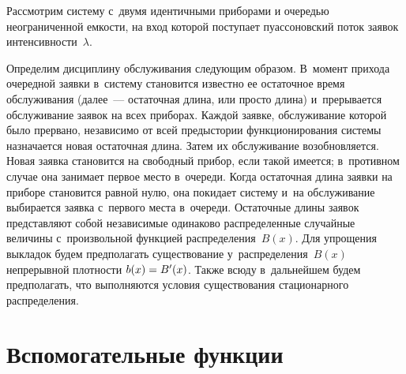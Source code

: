 \begin{multicols}{2}
Рассмотрим систему с~двумя идентичными приборами
и очередью неограниченной емкости, на вход которой поступает
пуассоновский поток заявок интенсивности~$\lambda$.


Определим дисциплину обслуживания сле\-ду\-ющим образом.
В~момент прихода очередной заявки в~систему 
становится известно ее остаточное время обслуживания (далее~--- 
остаточная длина, 
или прос\-то длина) и~прерывается обслуживание заявок на всех приборах.
Каждой заявке, обслуживание которой было прервано, 
независимо от всей предыс\-то\-рии функционирования системы
назначается новая остаточная длина. 
Затем их обслуживание возобновляется. Новая заявка становится на 
свободный прибор,
если такой имеется; в~противном случае она занимает первое место 
в~очереди. 
Когда остаточная длина заявки на приборе становится равной нулю, она 
покидает систему
и~на обслуживание выбирается заявка с~первого мес\-та в~очереди. 
Остаточные длины заявок пред\-став\-ля\-ют собой независимые одинаково 
распределенные случайные величины 
с~произвольной функцией распределения~$B(x)$. Для упрощения выкладок будем 
предполагать
существование у~распределения~$B(x)$ непрерывной плотности 
$b(x)\hm=B'(x)$.
Также всюду в~дальнейшем будем предполагать, что 
выполняются условия существования стационарного распределения.

\vspace*{-2pt}

\section{Вспомогательные функции}

\vspace*{-2pt}


\end{multicols}
